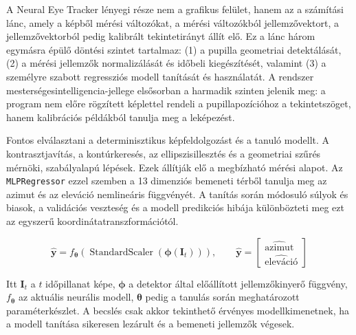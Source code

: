 \documentclass[12pt,a4paper,oneside]{book}
\begin{document}
A Neural Eye Tracker lényegi része nem a grafikus felület, hanem az a számítási lánc, amely a képből mérési változókat, a mérési változókból jellemzővektort, a jellemzővektorból pedig kalibrált tekintetirányt állít elő. Ez a lánc három egymásra épülő döntési szintet tartalmaz: (1) a pupilla geometriai detektálását, (2) a mérési jellemzők normalizálását és időbeli kiegészítését, valamint (3) a személyre szabott regressziós modell tanítását és használatát. A rendszer mesterségesintelligencia-jellege elsősorban a harmadik szinten jelenik meg: a program nem előre rögzített képlettel rendeli a pupillapozícióhoz a tekintetszöget, hanem kalibrációs példákból tanulja meg a leképezést.

Fontos elválasztani a determinisztikus képfeldolgozást és a tanuló modellt. A kontrasztjavítás, a kontúrkeresés, az ellipszisillesztés és a geometriai szűrés mérnöki, szabályalapú lépések. Ezek állítják elő a megbízható mérési alapot. Az \texttt{MLPRegressor} ezzel szemben a 13 dimenziós bemeneti térből tanulja meg az azimut és az eleváció nemlineáris függvényét. A tanítás során módosuló súlyok és biasok, a validációs veszteség és a modell predikciós hibája különbözteti meg ezt az egyszerű koordinátatranszformációtól.

{\large
\begin{equation}
    \hat{\mathbf{y}} =
    f_{\boldsymbol{\theta}}\!\left(
    \operatorname{StandardScaler}(\boldsymbol{\phi}(\mathbf{I}_t))
    \right),
    \qquad
    \hat{\mathbf{y}} =
    \begin{bmatrix}
    \widehat{\mathrm{azimut}} \\
    \widehat{\mathrm{eleváció}}
    \end{bmatrix}
\end{equation}
}%

Itt $\mathbf{I}_t$ a $t$ időpillanat képe, $\boldsymbol{\phi}$ a detektor által előállított jellemzőkinyerő függvény, $f_{\boldsymbol{\theta}}$ az aktuális neurális modell, $\boldsymbol{\theta}$ pedig a tanulás során meghatározott paraméterkészlet. A becslés csak akkor tekinthető érvényes modellkimenetnek, ha a modell tanítása sikeresen lezárult és a bemeneti jellemzők végesek.
\end{document}
